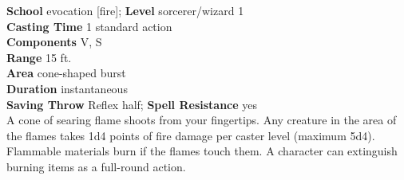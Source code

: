 \textbf{School} evocation [fire]; \textbf{Level} sorcerer/wizard 1\\
\textbf{Casting Time} 1 standard action\\
\textbf{Components} V, S\\
\textbf{Range} 15 ft.\\
\textbf{Area} cone-shaped burst\\
\textbf{Duration} instantaneous\\
\textbf{Saving Throw} Reflex half; \textbf{Spell Resistance} yes\\
A cone of searing flame shoots from your fingertips. Any creature in the area of the flames takes 1d4 points of fire damage per caster level (maximum 5d4). Flammable materials burn if the flames touch them. A character can extinguish burning items as a full-round action.\\
